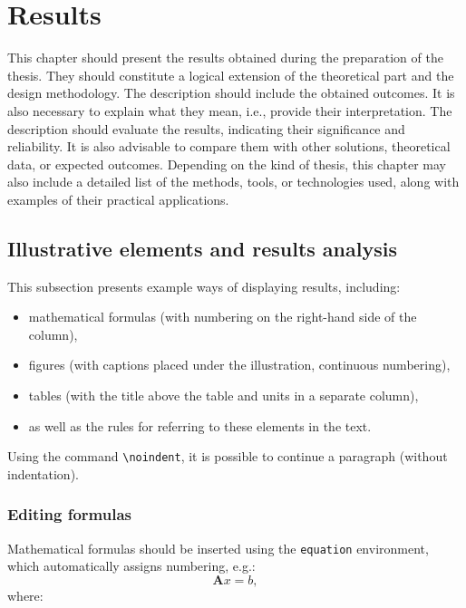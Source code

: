 \chapter{Results}\label{chapter:3_Results}
This chapter should present the results obtained during the preparation of the thesis. They should constitute a logical extension of the theoretical part and the design methodology. The description should include the obtained outcomes. It is also necessary to explain what they mean, i.e., provide their interpretation. The description should evaluate the results, indicating their significance and reliability. It is also advisable to compare them with other solutions, theoretical data, or expected outcomes. Depending on the kind of thesis, this chapter may also include a detailed list of the methods, tools, or technologies used, along with examples of their practical applications.

\section{Illustrative elements and results analysis}
\noindent This subsection presents example ways of displaying results, including:
\begin{itemize}
  \item mathematical formulas (with numbering on the right-hand side of the column),
  \item figures (with captions placed under the illustration, continuous numbering),
  \item tables (with the title above the table and units in a separate column),
  \item as well as the rules for referring to these elements in the text.
\end{itemize}

\noindent Using the command \verb|\noindent|, it is possible to continue a paragraph (without indentation).

\subsection{Editing formulas}
Mathematical formulas should be inserted using the \verb|equation| environment, which automatically assigns numbering, e.g.:
\begin{equation}
  \label{eq:linear_equation}
  \mathbf{A}x=b,
\end{equation}
\noindent where:

